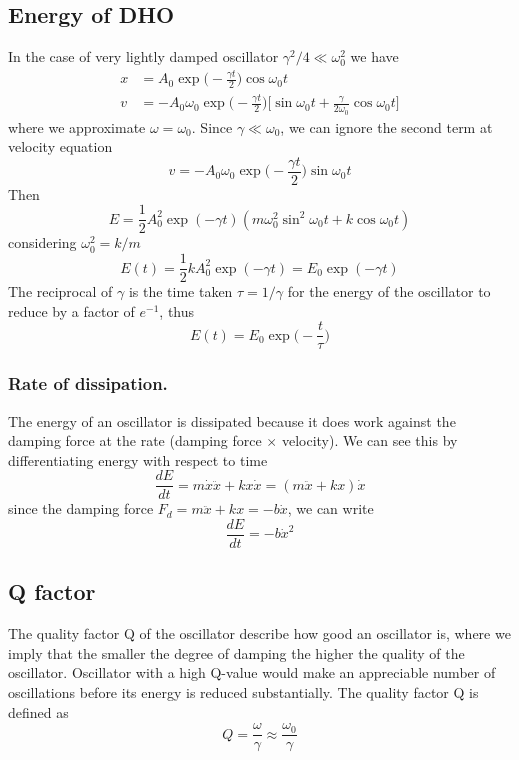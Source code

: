 \documentclass[../../../main.tex]{subfiles}
\begin{document}
\subsection{Energy of DHO}
In the case of very lightly damped oscillator $\gamma^2/4\ll \omega_0^2$ we have
\begin{align*}
    x &= A_0\exp\biggl(-\frac{\gamma t}{2}\biggr)\cos\omega_0 t\\
    v&=-A_0\omega_0\exp\biggl(-\frac{\gamma t}{2}\biggr)\biggl[\sin\omega_0t +\frac{\gamma}{2\omega_0}\cos\omega_0 t\biggr]
\end{align*}
where we approximate $\omega=\omega_0$. Since $\gamma \ll \omega_0$, we can ignore the second term at velocity equation
\begin{equation*}
    v=-A_0\omega_0\exp\biggl(-\frac{\gamma t}{2}\biggr)\sin\omega_0t 
\end{equation*}
Then
\begin{equation*}
    E=\frac{1}{2}A_0^2 \exp(-\gamma t)(m\omega_0^2\sin^2\omega_0t+k\cos\omega_0t)
\end{equation*}
considering $\omega_0^2=k/m$
\begin{equation*}
   E(t)= \frac{1}{2}kA_0^2\exp(-\gamma t) =E_0\exp(-\gamma t) 
\end{equation*}
The reciprocal of $\gamma$ is the time taken $\tau=1/\gamma$ for the energy of the oscillator to reduce by a factor of $e^{-1}$, thus
\begin{equation*}
    E(t)=E_0\exp \biggl(-\frac{t}{\tau}\biggr)
\end{equation*}

\subsubsection{Rate of dissipation.} The energy of an oscillator is dissipated because it does work against the damping force at the rate (damping force $\times$ velocity). We can see this by differentiating energy with respect to time
\begin{equation*}
    \frac{dE}{dt}=m\dot{x}\ddot{x}+kx\dot{x}=(m\ddot{x}+kx)\dot{x}
\end{equation*}
since the damping force $F_d=m\ddot{x}+kx=-b\dot{x}$, we can write
\begin{equation*}
    \frac{dE}{dt}=-b\dot{x}^2
\end{equation*}

\subsection{Q factor}
The quality factor Q of the oscillator describe how good an oscillator is, where we imply that the smaller the degree of damping the higher the quality of the oscillator. Oscillator with a high Q-value would make an appreciable number of oscillations before its energy is reduced substantially. The quality factor Q is defined as
\begin{equation*}
    Q=\frac{\omega}{\gamma}\approx\frac{\omega_0}{\gamma}
\end{equation*}
\end{document}
